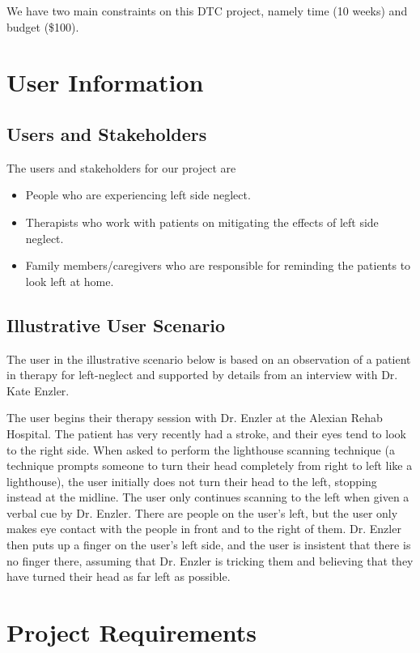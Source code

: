 We have two main constraints on this DTC project, namely time (10 weeks) and
budget (\$100).

\section{User Information}

\subsection{Users and Stakeholders}

The users and stakeholders for our project are
\begin{itemize}
\item People who are experiencing left side neglect.
\item Therapists who work with patients on mitigating the effects of left side
  neglect. 
\item Family members/caregivers who are responsible for reminding the patients
  to look left at home. 
\end{itemize}

\subsection{Illustrative User Scenario}

The user in the illustrative scenario below is based on an observation of a
patient in therapy for left-neglect and supported by details from an interview
with Dr. Kate Enzler.

The user begins their therapy session with Dr. Enzler at the Alexian Rehab
Hospital. The patient has very recently had a stroke, and their eyes tend to
look to the right side. When asked to perform the lighthouse scanning technique
(a technique prompts someone to turn their head completely from right to left
like a lighthouse), the user initially does not turn their head to the left,
stopping instead at the midline. The user only continues scanning to the left
when given a verbal cue by Dr. Enzler. There are people on the user’s left, but
the user only makes eye contact with the people in front and to the right of
them. Dr. Enzler then puts up a finger on the user’s left side, and the user is
insistent that there is no finger there, assuming that Dr. Enzler is tricking
them and believing that they have turned their head as far left as possible.

\section{Project Requirements}

